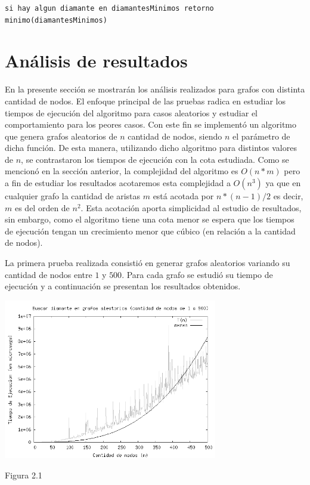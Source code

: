 \documentclass[a4paper,11pt] {article}
\begin{document}
\begin{verbatim}
si hay algun diamante en diamantesMinimos retorno minimo(diamantesMinimos)
\end{verbatim}

\section*{An\'alisis de resultados}

En la presente secci\'on se mostrar\'an los an\'alisis realizados para grafos con distinta cantidad de nodos. El enfoque principal de las pruebas radica en estudiar los tiempos de ejecuci\'on del algoritmo para casos aleatorios y estudiar el comportamiento para los peores casos. Con este fin se implement\'o un algoritmo que genera grafos aleatorios de $n$ cantidad de nodos, siendo $n$ el par\'ametro de dicha funci\'on. De esta manera, utilizando dicho algoritmo para distintos valores de $n$, se contrastaron los tiempos de ejecuci\'on con la cota estudiada. Como se mencion\'o en la secci\'on anterior, la complejidad del algoritmo es $O(n*m)$ pero a fin de estudiar los resultados acotaremos esta complejidad a $O(n^{3})$ ya que en cualquier grafo la cantidad de aristas $m$ est\'a acotada por $n*(n-1)/2$ es decir, $m$ es del orden de $n^{2}$. Esta acotaci\'on aporta simplicidad al estudio de resultados, sin embargo, como el algoritmo tiene una cota menor se espera que los tiempos de ejecuci\'on tengan un crecimiento menor que c\'ubico (en relaci\'on a la cantidad de nodos).

La primera prueba realizada consisti\'o en generar grafos aleatorios variando su cantidad de nodos entre $1$ y $500$. Para cada grafo se estudi\'o su tiempo de ejecuci\'on y a continuaci\'on se presentan los resultados obtenidos.

\begin{center}
 \includegraphics[width=0.7\textwidth]{Plots/Tp2Ej2-Complejidad.png}
\begin{center}
Figura 2.1
\end{center}
\end{center}
\end{document}
